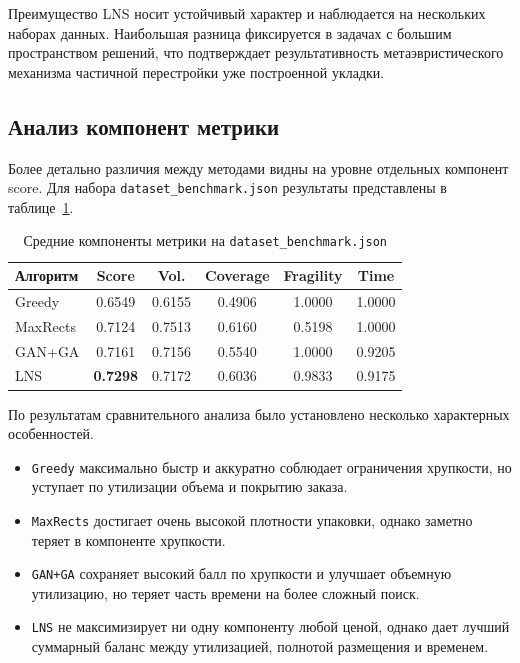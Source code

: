 \documentclass[14pt,a4paper]{extarticle}
\begin{document}
Преимущество LNS носит устойчивый характер и наблюдается на нескольких наборах данных. Наибольшая разница фиксируется в задачах с большим пространством решений, что подтверждает результативность метаэвристического механизма частичной перестройки уже построенной укладки.

\subsection{Анализ компонент метрики}

Более детально различия между методами видны на уровне отдельных компонент score. Для набора \texttt{dataset\_benchmark.json} результаты представлены в таблице~\ref{tab:components-benchmark}.

\begin{table}[H]
\centering
\caption{Средние компоненты метрики на \texttt{dataset\_benchmark.json}}
\label{tab:components-benchmark}
\begin{tabular}{lccccc}
\toprule
\textbf{Алгоритм} & \textbf{Score} & \textbf{Vol.} & \textbf{Coverage} & \textbf{Fragility} & \textbf{Time} \\
\midrule
Greedy & 0.6549 & 0.6155 & 0.4906 & 1.0000 & 1.0000 \\
MaxRects & 0.7124 & 0.7513 & 0.6160 & 0.5198 & 1.0000 \\
GAN+GA & 0.7161 & 0.7156 & 0.5540 & 1.0000 & 0.9205 \\
LNS & \textbf{0.7298} & 0.7172 & 0.6036 & 0.9833 & 0.9175 \\
\bottomrule
\end{tabular}
\end{table}

По результатам сравнительного анализа было установлено несколько характерных особенностей.

\begin{itemize}
  \item \texttt{Greedy} максимально быстр и аккуратно соблюдает ограничения хрупкости, но уступает по утилизации объема и покрытию заказа.
  \item \texttt{MaxRects} достигает очень высокой плотности упаковки, однако заметно теряет в компоненте хрупкости.
  \item \texttt{GAN+GA} сохраняет высокий балл по хрупкости и улучшает объемную утилизацию, но теряет часть времени на более сложный поиск.
  \item \texttt{LNS} не максимизирует ни одну компоненту любой ценой, однако дает лучший суммарный баланс между утилизацией, полнотой размещения и временем.
\end{itemize}
\end{document}
